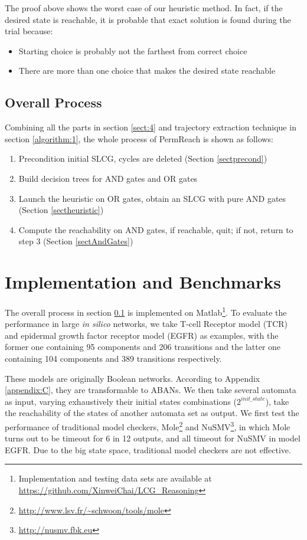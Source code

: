 \documentclass[runningheads]{llncs}
\begin{document}
The proof above shows the worst case of our heuristic method. 
In fact, if the desired state is reachable, it is probable that exact solution is found during the trial because:
\begin{itemize}
\item Starting choice is probably not the farthest from correct choice
\item There are more than one choice that makes the desired state reachable
\end{itemize}

\subsection{Overall Process}\label{sectOverall}
Combining all the parts in section \ref{sect:4} and trajectory extraction technique in section \ref{algorithm:1}, the whole process of PermReach is shown as follows:
\begin{enumerate}
\item Precondition initial SLCG, cycles are deleted (Section \ref{sectprecond})
\item Build decision trees for AND gates and OR gates
\item Launch the heuristic on OR gates, obtain an SLCG with pure AND gates (Section \ref{sectheuristic})
\item Compute the reachability on AND gates, if reachable, quit; if not, return to step 3 (Section \ref{sectAndGates})
\end{enumerate}

\section{Implementation and Benchmarks}\label{sect:5}
The overall process in section \ref{sectOverall} is implemented on Matlab\footnote{Implementation and testing data sets are available at \url{https://github.com/XinweiChai/LCG_Reasoning}}. 
To evaluate the performance in large \textit{in silico} networks, we take T-cell Receptor model (TCR) \cite{saez2007logical} and epidermal growth factor receptor model (EGFR) \cite{samaga2009logic} as examples, with the former one containing 95 components and 206 transitions and the latter one containing 104 components and 389 transitions respectively. 

These models are originally Boolean networks.
According to Appendix \ref{appendix:C}, they are transformable to ABANs. We then take several automata as input, varying exhaustively their initial states combinations ($2^{init\_state}$), take the reachability of the states of another automata set as output.
We first test the performance of traditional model checkers, Mole\footnote{\url{http://www.lsv.fr/~schwoon/tools/mole}} and NuSMV\footnote{\url{http://nusmv.fbk.eu}}, in which Mole turns out to be timeout for 6 in 12 outputs, and all timeout for NuSMV in model EGFR.
Due to the big state space, traditional model checkers are not effective. 
\end{document}
